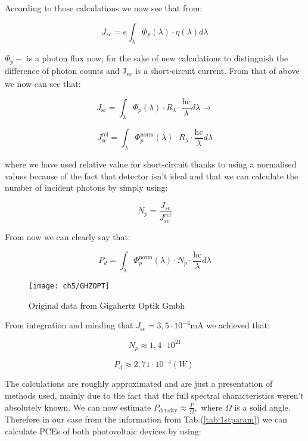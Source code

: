 According to those calculations we now see that from:

\begin{equation}
J_{sc} = e\int_{\lambda}^{}{\Phi_{p}(\lambda ) \cdot \eta (\lambda) d \lambda }
\end{equation}

\(\Phi_{p} -\) is a photon flux now, for the sake of new calculations to distinguish the difference of photon counts and J­\textsubscript{sc} is a short-circuit current. From that of above we now can see that:

\begin{equation}
J_{\text{sc}} = \int_{\lambda}^{}{\Phi_{p}\left( \lambda \right) \cdot R_{\lambda } \cdot \frac{\text{hc}}{\lambda }d\lambda } \rightarrow
\end{equation}

\begin{equation}
J_{\text{sc}}^{\text{rel}} = \int_{\lambda}^{}{\Phi_{p}^{\text{norm}}\left( \lambda \right) \cdot R_{\lambda} \cdot \frac{\text{hc}}{\lambda}d\lambda }
\end{equation}


where we have used relative value for short-circuit thanks to using a
normalised values because of the fact that detector isn't ideal and that we can calculate the number of incident photons by simply using:

\begin{equation}
N_{p} = \frac{J_{sc}}{J_{sc}^{rel}}
\end{equation}

From now we can clearly say that:

\begin{equation}
P_{d} = \int_{\lambda}^{}{\Phi_{p}^{\text{norm}}\left( \lambda \right) \cdot N_{p} \cdot \frac{\text{hc}}{\lambda}d \lambda }
\end{equation}

\begin{figure}[H]
\center
\texttt{[image: ch5/GHZOPT]}
\caption{Original data from Gigahertz Optik Gmbh}
\end{figure}

From integration and minding that
\(J_{\text{sc}} = 3,5 \cdot 10^{- 4}\text{mA\ }\)we achieved that:

\[N_{p} \approx 1,4 \cdot 10^{21}\]

\[P_{d} \approx 2,71 \cdot 10^{-4} \left( W \right)\ \]

The calculations are roughly approximated and are just a
presentation of methods used, mainly due to the fact that the full spectral characteristics weren't absolutely known. We can now estimate 
\(P_{\text{density}} \approx \frac{P}{\Omega},\) where \(\Omega\) is a
solid angle. Therefore in our case from the information from Tab.(\ref{tab:1stparam}) we can calculate PCEs of both photovoltaic devices by using:

